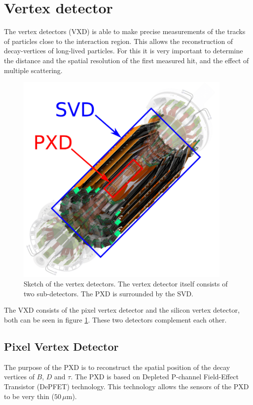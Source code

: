 \documentclass[a4paper,11pt,twosided,final,german,openbib,pdftex,listof=totoc,bibliography=totoc]{scrbook}
\begin{document}
\section{Vertex detector}
\label{sec:vertexDet}

The vertex detectors (VXD) is able to make precise measurements of the tracks of particles close to the interaction region. This allows the reconstruction of decay-vertices of long-lived particles. For this it is very important to determine the distance and the spatial resolution of the first measured hit, and the effect of multiple scattering.


\begin{figure}[h!]
	\begin{center}
		\includegraphics[width=10.5cm]{Bilder/PXD_SVD}
	\end{center}
\caption[Vertex Detector]{Sketch of the vertex detectors. The vertex detector itself consists of two sub-detectors. The PXD is surrounded by the SVD. \cite{OnlineDataReduction} }
\label{fig:VertexDet}
\end{figure}

The VXD consists of the pixel vertex detector and the silicon vertex detector, both can be seen in figure \ref{fig:VertexDet}. These two detectors complement each other.


\subsection{Pixel Vertex Detector}
\label{sec:Pixel}
The purpose of the PXD is to reconstruct the spatial position of the decay vertices of $B$, $D$ and $\tau$.
The PXD is based on Depleted P-channel Field-Effect Transistor (DePFET) technology. This technology allows the sensors of the PXD to be very thin ($50\,\mu\textrm{m}$).
\end{document}
